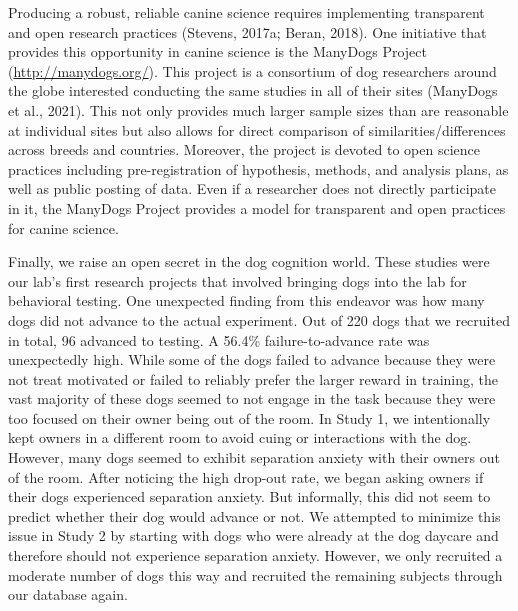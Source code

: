 \documentclass[
  pub,floatsintext]{apa6}
\begin{document}
Producing a robust, reliable canine science requires implementing transparent and open research practices (Stevens, 2017a; Beran, 2018). One initiative that provides this opportunity in canine science is the ManyDogs Project (\url{http://manydogs.org/}). This project is a consortium of dog researchers around the globe interested conducting the same studies in all of their sites (ManyDogs et al., 2021). This not only provides much larger sample sizes than are reasonable at individual sites but also allows for direct comparison of similarities/differences across breeds and countries. Moreover, the project is devoted to open science practices including pre-registration of hypothesis, methods, and analysis plans, as well as public posting of data. Even if a researcher does not directly participate in it, the ManyDogs Project provides a model for transparent and open practices for canine science.

Finally, we raise an open secret in the dog cognition world. These studies were our lab's first research projects that involved bringing dogs into the lab for behavioral testing. One unexpected finding from this endeavor was how many dogs did not advance to the actual experiment. Out of 220 dogs that we recruited in total, 96 advanced to testing. A 56.4\% failure-to-advance rate was unexpectedly high. While some of the dogs failed to advance because they were not treat motivated or failed to reliably prefer the larger reward in training, the vast majority of these dogs seemed to not engage in the task because they were too focused on their owner being out of the room. In Study 1, we intentionally kept owners in a different room to avoid cuing or interactions with the dog. However, many dogs seemed to exhibit separation anxiety with their owners out of the room. After noticing the high drop-out rate, we began asking owners if their dogs experienced separation anxiety. But informally, this did not seem to predict whether their dog would advance or not. We attempted to minimize this issue in Study 2 by starting with dogs who were already at the dog daycare and therefore should not experience separation anxiety. However, we only recruited a moderate number of dogs this way and recruited the remaining subjects through our database again.
\end{document}
